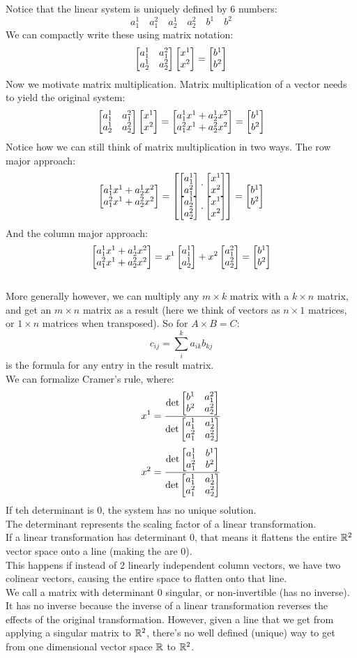 \documentclass[12pt]{article}
\begin{document}
    Notice that the linear system is uniquely
    defined by 6 numbers:
    \[ a_1^1 \quad a_1^2 \quad a_2^1 \quad a_2^2
    \quad b^1 \quad b^2 \]
    We can compactly write these using matrix notation:
    \[ \begin{bmatrix} a_1^1 & a_1^2 \\ a_2^1 & a_2^2 \end{bmatrix}
    \begin{bmatrix} x^1 \\ x^2 \end{bmatrix} = \begin{bmatrix} b^1 \\ b^2 \end{bmatrix} \]
    Now we motivate matrix multiplication.
    Matrix multiplication of a vector needs
    to yield the original system:
    \[ \begin{bmatrix} a_1^1 & a_1^2 \\ a_2^1 & a_2^2 \end{bmatrix}
    \begin{bmatrix} x^1 \\ x^2 \end{bmatrix}
    = \begin{bmatrix} a_1^1x^1 + a_2^1x^2 \\ a_1^2x^1 + a_2^2x^2 \end{bmatrix}
    = \begin{bmatrix} b^1 \\ b^2 \end{bmatrix} \]
    Notice how we can still think of matrix multiplication
    in two ways.
    The row major approach:
    \[ \begin{bmatrix} a_1^1x^1 + a_2^1x^2 \\ a_1^2x^1 + a_2^2x^2 \end{bmatrix}
    = \begin{bmatrix} \begin{bmatrix} a_1^1 \\ a_1^2 \end{bmatrix} \cdot \begin{bmatrix} x^1 \\ x^2 \end{bmatrix} \\ \begin{bmatrix} a_2^1 \\ a_2^2 \end{bmatrix} \cdot \begin{bmatrix} x^1 \\ x^2 \end{bmatrix} \end{bmatrix}
    = \begin{bmatrix} b^1 \\ b^2 \end{bmatrix} \]
    And the column major approach:
    \[ \begin{bmatrix} a_1^1x^1 + a_2^1x^2 \\ a_1^2x^1 + a_2^2x^2 \end{bmatrix}
    = x^1\begin{bmatrix} a_1^1 \\ a_2^1 \end{bmatrix} + x^2\begin{bmatrix} a_1^2 \\ a_2^2 \end{bmatrix}
    = \begin{bmatrix} b^1 \\ b^2 \end{bmatrix} \]
    \\

    More generally however, we can multiply
    any $m \times k$ matrix with a $k \times n$
    matrix, and get an $m\times n$ matrix as a result
    (here we think of vectors as $n \times 1$ matrices,
    or $1 \times n$ matrices when transposed).
    So for $A \times B = C$:
    \[ c_{ij} = \sum_{i}^{k}a_{ik}b_{kj} \]
    is the formula for any entry in the result matrix. \\

    We can formalize Cramer's rule,
    where:
    \[ x^1 = \dfrac{
        \det{\begin{bmatrix} b^1 & a_1^2 \\ b^2 & a_2^2 \end{bmatrix}}
    }{\det{\begin{bmatrix} a_1^1 & a_2^1 \\ a_1^2 & a_2^2 \end{bmatrix}}} \]
    \[ x^2 = \dfrac{
        \det{\begin{bmatrix} a_1^1 & b^1 \\ a_1^2 & b^2 \end{bmatrix}}
    }{\det{\begin{bmatrix} a_1^1 & a_2^1 \\ a_1^2 & a_2^2 \end{bmatrix}}} \]
    If teh determinant is 0, 
    the system has no unique solution. \\

    The determinant represents the scaling
    factor of a linear transformation. \\
    If a linear transformation has determinant 0,
    that means it flattens the entire $\mathbb{R}^2$
    vector space onto a line (making the are 0). \\
    This happens if instead of 2 linearly
    independent column vectors, we have two colinear
    vectors, causing the entire space
    to flatten onto that line. \\
    We call a matrix with determinant 0 singular,
    or non-invertible (has no inverse). \\
    It has no inverse because the inverse
    of a linear transformation reverses the effects
    of the original transformation.
    However, given a line that we get from
    applying a singular matrix to $\mathbb{R}^2$,
    there's no well defined (unique) way to get 
    from one dimensional vector space $\mathbb{R}$ to $\mathbb{R}^2$. \\

 
\end{document}
